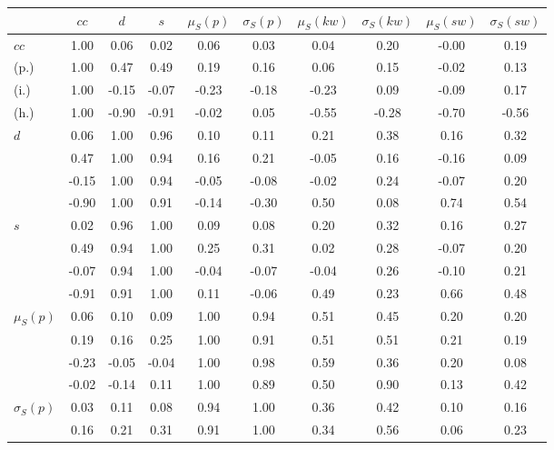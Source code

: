 \begin{table*}[h!]
\begin{center}
\begin{tabular}{| l | c | c | c | c | c | c | c | c | c |}\hline
 & $cc$ & $d$ & $s$ & $\mu_S(p)$ & $\sigma_S(p)$ & $\mu_S(kw)$ & $\sigma_S(kw)$ & $\mu_S(sw)$ & $\sigma_S(sw)$ \\\hline
$cc$ & 1.00  & 0.06  & 0.02  & 0.06  & 0.03  & 0.04  & 0.20  & -0.00  & 0.19 \\\hline
(p.) & 1.00  & 0.47  & 0.49  & 0.19  & 0.16  & 0.06  & 0.15  & -0.02  & 0.13 \\\hline
(i.) & 1.00  & -0.15  & -0.07  & -0.23  & -0.18  & -0.23  & 0.09  & -0.09  & 0.17 \\\hline
(h.) & 1.00  & -0.90  & -0.91  & -0.02  & 0.05  & -0.55  & -0.28  & -0.70  & -0.56 \\\hline
$d$ & 0.06  & 1.00  & 0.96  & 0.10  & 0.11  & 0.21  & 0.38  & 0.16  & 0.32 \\\hline
 & 0.47  & 1.00  & 0.94  & 0.16  & 0.21  & -0.05  & 0.16  & -0.16  & 0.09 \\\hline
 & -0.15  & 1.00  & 0.94  & -0.05  & -0.08  & -0.02  & 0.24  & -0.07  & 0.20 \\\hline
 & -0.90  & 1.00  & 0.91  & -0.14  & -0.30  & 0.50  & 0.08  & 0.74  & 0.54 \\\hline
$s$ & 0.02  & 0.96  & 1.00  & 0.09  & 0.08  & 0.20  & 0.32  & 0.16  & 0.27 \\\hline
 & 0.49  & 0.94  & 1.00  & 0.25  & 0.31  & 0.02  & 0.28  & -0.07  & 0.20 \\\hline
 & -0.07  & 0.94  & 1.00  & -0.04  & -0.07  & -0.04  & 0.26  & -0.10  & 0.21 \\\hline
 & -0.91  & 0.91  & 1.00  & 0.11  & -0.06  & 0.49  & 0.23  & 0.66  & 0.48 \\\hline
$\mu_S(p)$ & 0.06  & 0.10  & 0.09  & 1.00  & 0.94  & 0.51  & 0.45  & 0.20  & 0.20 \\\hline
 & 0.19  & 0.16  & 0.25  & 1.00  & 0.91  & 0.51  & 0.51  & 0.21  & 0.19 \\\hline
 & -0.23  & -0.05  & -0.04  & 1.00  & 0.98  & 0.59  & 0.36  & 0.20  & 0.08 \\\hline
 & -0.02  & -0.14  & 0.11  & 1.00  & 0.89  & 0.50  & 0.90  & 0.13  & 0.42 \\\hline
$\sigma_S(p)$ & 0.03  & 0.11  & 0.08  & 0.94  & 1.00  & 0.36  & 0.42  & 0.10  & 0.16 \\\hline
 & 0.16  & 0.21  & 0.31  & 0.91  & 1.00  & 0.34  & 0.56  & 0.06  & 0.23 \\\hline

\end{tabular}
\end{center}
\end{table*}
